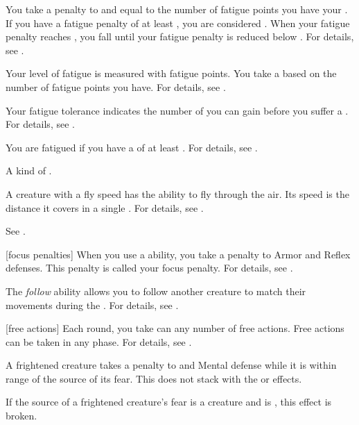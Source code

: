  You take a penalty to  and  equal to the number of fatigue points you have \sub your .
If you have a fatigue penalty of at least , you are considered .
When your fatigue penalty reaches , you fall  until your fatigue penalty is reduced below .
For details, see .

 Your level of fatigue is measured with fatigue points.
You take a  based on the number of fatigue points you have.
For details, see .

 Your fatigue tolerance indicates the number of  you can gain before you suffer a .
For details, see .

 You are fatigued if you have a  of at least .
For details, see .

 A kind of .

 A creature with a fly speed has the ability to fly through the air.
Its speed is the distance it covers in a single .
For details, see .

 See .

[focus penalties] When you use a  ability, you take a  penalty to Armor and Reflex defenses.
This penalty is called your focus penalty.
For details, see .

 The \textit{follow} ability allows you to follow another creature to match their movements during the .
For details, see .

[free actions] Each round, you take can any number of free actions.
Free actions can be taken in any phase.
For details, see .

 A frightened creature takes a  penalty to  and Mental defense while it is within \rngmed range of the source of its fear.
This does not stack with the  or  effects.

If the source of a frightened creature's fear is a creature and is , this effect is broken.

